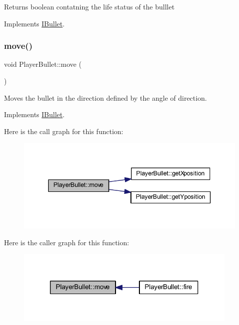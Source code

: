 \begin{DoxyReturn}{Returns}
boolean contatning the life status of the bulllet 
\end{DoxyReturn}


Implements \hyperlink{class_i_bullet_ac1252496738126ec94a97512011b9112}{I\+Bullet}.

\mbox{\label{class_player_bullet_a8469319697d70e04399d8aaac3902c80}} 
\subsubsection{\texorpdfstring{move()}{move()}}
{\footnotesize\ttfamily void Player\+Bullet\+::move (\begin{DoxyParamCaption}{ }\end{DoxyParamCaption})\hspace{0.3cm}{\ttfamily [virtual]}}



Moves the bullet in the direction defined by the angle of direction. 



Implements \hyperlink{class_i_bullet_a0884074f0bc793fb5a52ac33842622fd}{I\+Bullet}.

Here is the call graph for this function\+:\nopagebreak
\begin{figure}[H]
\begin{center}
\leavevmode
\includegraphics[width=343pt]{class_player_bullet_a8469319697d70e04399d8aaac3902c80_cgraph}
\end{center}
\end{figure}
Here is the caller graph for this function\+:\nopagebreak
\begin{figure}[H]
\begin{center}
\leavevmode
\includegraphics[width=302pt]{class_player_bullet_a8469319697d70e04399d8aaac3902c80_icgraph}
\end{center}
\end{figure}
\mbox{\label{class_player_bullet_a09347ab7665742fc7d492fe26c3a6bce}} 
